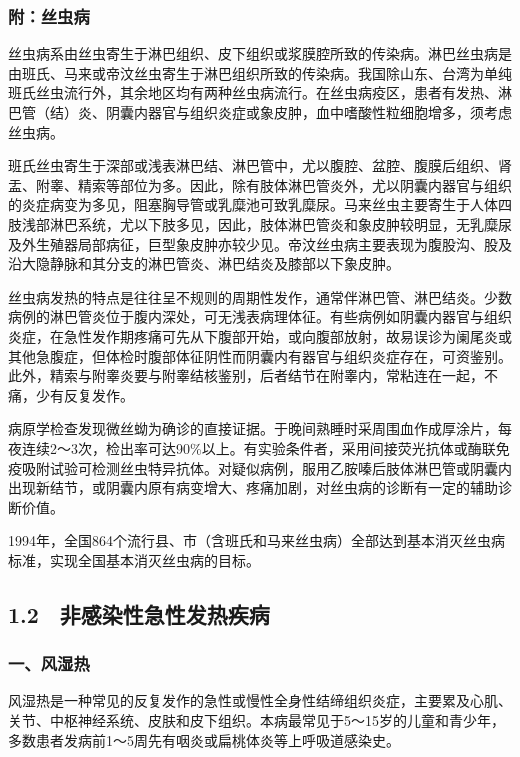 \protect\hypertarget{text00018.html}{}{}

\subsubsection{附：丝虫病}

丝虫病系由丝虫寄生于淋巴组织、皮下组织或浆膜腔所致的传染病。淋巴丝虫病是由班氏、马来或帝汶丝虫寄生于淋巴组织所致的传染病。我国除山东、台湾为单纯班氏丝虫流行外，其余地区均有两种丝虫病流行。在丝虫病疫区，患者有发热、淋巴管（结）炎、阴囊内器官与组织炎症或象皮肿，血中嗜酸性粒细胞增多，须考虑丝虫病。

班氏丝虫寄生于深部或浅表淋巴结、淋巴管中，尤以腹腔、盆腔、腹膜后组织、肾盂、附睾、精索等部位为多。因此，除有肢体淋巴管炎外，尤以阴囊内器官与组织的炎症病变为多见，阻塞胸导管或乳糜池可致乳糜尿。马来丝虫主要寄生于人体四肢浅部淋巴系统，尤以下肢多见，因此，肢体淋巴管炎和象皮肿较明显，无乳糜尿及外生殖器局部病征，巨型象皮肿亦较少见。帝汶丝虫病主要表现为腹股沟、股及沿大隐静脉和其分支的淋巴管炎、淋巴结炎及膝部以下象皮肿。

丝虫病发热的特点是往往呈不规则的周期性发作，通常伴淋巴管、淋巴结炎。少数病例的淋巴管炎位于腹内深处，可无浅表病理体征。有些病例如阴囊内器官与组织炎症，在急性发作期疼痛可先从下腹部开始，或向腹部放射，故易误诊为阑尾炎或其他急腹症，但体检时腹部体征阴性而阴囊内有器官与组织炎症存在，可资鉴别。此外，精索与附睾炎要与附睾结核鉴别，后者结节在附睾内，常粘连在一起，不痛，少有反复发作。

病原学检查发现微丝蚴为确诊的直接证据。于晚间熟睡时采周围血作成厚涂片，每夜连续2～3次，检出率可达90\%以上。有实验条件者，采用间接荧光抗体或酶联免疫吸附试验可检测丝虫特异抗体。对疑似病例，服用乙胺嗪后肢体淋巴管或阴囊内出现新结节，或阴囊内原有病变增大、疼痛加剧，对丝虫病的诊断有一定的辅助诊断价值。

1994年，全国864个流行县、市（含班氏和马来丝虫病）全部达到基本消灭丝虫病标准，实现全国基本消灭丝虫病的目标。

\protect\hypertarget{text00019.html}{}{}

\subsection{1.2　非感染性急性发热疾病}

\subsubsection{一、风湿热}

风湿热是一种常见的反复发作的急性或慢性全身性结缔组织炎症，主要累及心肌、关节、中枢神经系统、皮肤和皮下组织。本病最常见于5～15岁的儿童和青少年，多数患者发病前1～5周先有咽炎或扁桃体炎等上呼吸道感染史。

